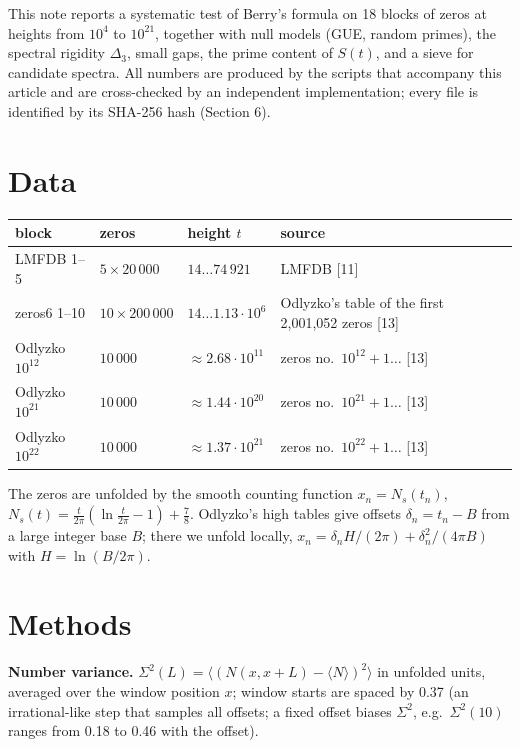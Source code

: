 \documentclass[11pt]{article}
\begin{document}
This note reports a systematic test of Berry's formula on 18 blocks of
zeros at heights from \(10^4\) to \(10^{21}\), together with null models
(GUE, random primes), the spectral rigidity \(\Delta_3\), small gaps,
the prime content of \(S(t)\), and a sieve for candidate spectra. All
numbers are produced by the scripts that accompany this article and are
cross-checked by an independent implementation; every file is identified
by its SHA-256 hash (Section 6).

\hypertarget{data}{%
\section{Data}\label{data}}

\begin{center}\small
\begin{tabular}{@{}llll@{}}
\toprule
block & zeros & height $t$ & source \\
\midrule
LMFDB 1--5 & $5 \times 20\,000$ & $14 \dots 74\,921$ & LMFDB [11] \\
zeros6 1--10 & $10 \times 200\,000$ & $14 \dots 1.13 \cdot 10^6$ & Odlyzko's table of the first 2,001,052 zeros [13] \\
Odlyzko $10^{12}$ & $10\,000$ & $\approx 2.68 \cdot 10^{11}$ & zeros no.\ $10^{12}+1 \dots$ [13] \\
Odlyzko $10^{21}$ & $10\,000$ & $\approx 1.44 \cdot 10^{20}$ & zeros no.\ $10^{21}+1 \dots$ [13] \\
Odlyzko $10^{22}$ & $10\,000$ & $\approx 1.37 \cdot 10^{21}$ & zeros no.\ $10^{22}+1 \dots$ [13] \\
\bottomrule
\end{tabular}
\end{center}

The zeros are unfolded by the smooth counting function
\(x_n = N_s(t_n)\),
\(N_s(t) = \frac{t}{2\pi}\left(\ln\frac{t}{2\pi} - 1\right) + \frac{7}{8}\).
Odlyzko's high tables give offsets \(\delta_n = t_n - B\) from a large
integer base \(B\); there we unfold locally,
\(x_n = \delta_n H/(2\pi) + \delta_n^2/(4\pi B)\) with
\(H = \ln(B/2\pi)\).

\hypertarget{methods}{%
\section{Methods}\label{methods}}

\textbf{Number variance.}
\(\Sigma^2(L) = \langle (N(x, x+L) - \langle N \rangle)^2 \rangle\) in
unfolded units, averaged over the window position \(x\); window starts
are spaced by 0.37 (an irrational-like step that samples all offsets; a
fixed offset biases \(\Sigma^2\), e.g.~\(\Sigma^2(10)\) ranges from 0.18
to 0.46 with the offset).
\end{document}
